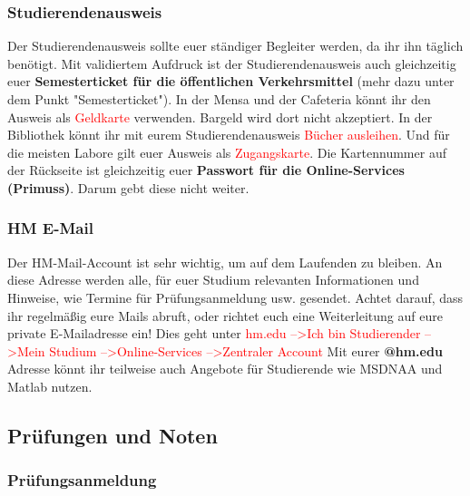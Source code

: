 \subsubsection{Studierendenausweis}

Der Studierendenausweis sollte euer ständiger Begleiter werden, da ihr ihn täglich benötigt. Mit validiertem Aufdruck ist der Studierendenausweis auch gleichzeitig euer \textbf{Semesterticket für die öffentlichen Verkehrsmittel} (mehr dazu unter dem Punkt "Semesterticket"). In der Mensa und der Cafeteria könnt ihr den Ausweis als \textcolor{red}{Geldkarte} verwenden. Bargeld wird dort nicht akzeptiert. In der Bibliothek könnt ihr mit eurem Studierendenausweis \textcolor{red}{Bücher ausleihen}. Und für die meisten Labore gilt euer Ausweis als \textcolor{red}{Zugangskarte}. Die Kartennummer auf der Rückseite ist gleichzeitig euer \textbf{Passwort für die Online-Services (Primuss)}. Darum gebt diese nicht weiter.

\subsubsection{HM E-Mail}

Der HM-Mail-Account ist sehr wichtig, um auf dem Laufenden zu bleiben. An diese Adresse werden alle, für euer Studium relevanten Informationen und Hinweise, wie Termine für Prüfungsanmeldung usw. gesendet. Achtet darauf, dass ihr regelmäßig eure Mails abruft, oder richtet euch eine Weiterleitung auf eure private E-Mailadresse ein!\doublebreak
Dies geht unter \textcolor{red}{hm.edu --\textgreater Ich bin Studierender --\textgreater Mein Studium --\textgreater Online-Services --\textgreater Zentraler Account}\doublebreak
Mit eurer  \textbf{@hm.edu}  Adresse könnt ihr teilweise auch Angebote für Studierende wie MSDNAA und Matlab nutzen.

\subsection{Prüfungen und Noten}
\subsubsection{Prüfungsanmeldung}

